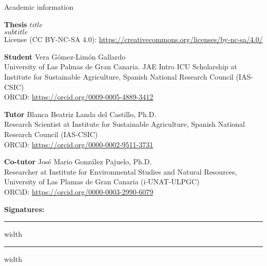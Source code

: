 \begin{flushleft}
  \Large
    Academic information
        
  \vspace{0.5cm}
  \normalsize
  \textbf{Thesis}
    $title$\\
    $subtitle$\\
    License (CC BY-NC-SA 4.0): \url{https://creativecommons.org/licenses/by-nc-sa/4.0/}

  
  \vspace{0.5cm}
  \textbf{Student}
    Vera Gómez-Limón Gallardo\\
    University of Las Palmas de Gran Canaria. JAE Intro ICU Scholarship at Institute for Sustainable Agriculture, Spanish National Research Council (IAS-CSIC)\\
    ORCiD: \url{https://orcid.org/0009-0005-4889-3412}
  
  \vspace{0.5cm}
  \textbf{Tutor}
    Blanca Beatriz Landa del Castillo, Ph.D.\\
    Research Scientist at Institute for Sustainable Agriculture, Spanish National Research Council (IAS-CSIC)\\
    ORCiD: \url{https://orcid.org/0000-0002-9511-3731}
  
  \vspace{0.5cm}
  \textbf{Co-tutor}
    José Mario González Pajuelo, Ph.D.\\
    Researcher at Institute for Environmental Studies and Natural Resources, University of Las Plamas de Gran Canaria (i-UNAT-ULPGC)\\
    ORCiD: \url{https://orcid.org/0000-0003-2990-6079}
  
  \vspace{1.0cm}
  \centerline{\textbf{Signatures:}}
  
  \vspace{0.5cm}
  \hrule height 0.4pt width \textwidth
  \vfill
  \hrule height 0.4pt width \textwidth
\end{flushleft}